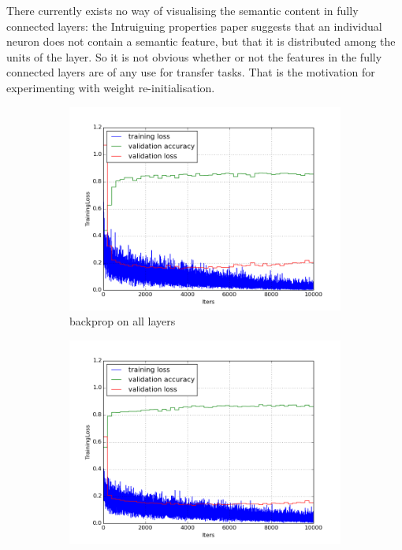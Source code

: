 \documentclass[a4paper,11pt]{article}
\begin{document}
There currently exists no way of visualising the semantic content in fully connected layers: the Intruiguing properties paper suggests that an individual neuron does not contain a semantic feature, but that it is distributed among the units of the layer. So it is not obvious whether or not the features in the fully connected layers are of any use for transfer tasks. That is the motivation for experimenting with weight re-initialisation. \\


\begin{figure}
    \centering
    \begin{minipage}[b]{\textwidth}
      \begin{subfigure}{.5\textwidth} 
        \centering
        \includegraphics[scale=0.4]{images/plot_clampdet_none_reinit.png}
        \caption{backprop on all layers}\label{fig:2a}
      \end{subfigure}%
      \begin{subfigure}{.5\textwidth} 
        \centering
        \includegraphics[scale=0.4]{images/plot_clampdet_none-10k.png}

\end{subfigure}
\end{minipage}
\end{figure}
\end{document}
